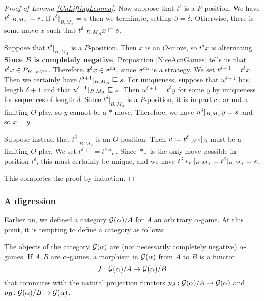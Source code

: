 \documentclass[11pt]{article} %
\begin{document}
\begin{proof}[Proof of Lemma \ref{CnLiftingLemma}]
  Now suppose that $t^\delta$ is a $P$-position.  We have $t^\delta\vert_{B,M_A}\sqsubseteq s$.  If $t^\delta\vert_{B,M_A}=s$ then we terminate, setting $\beta=\delta$.  Otherwise, there is some move $x$ such that $t^\delta\vert_{B,M_A}x\sqsubseteq s$.  

  Suppose that $t^\delta\vert_{B,M_A}$ is a $P$-position.  Then $x$ is an $O$-move, so $t^\delta x$ is alternating.  \textbf{Since $B$ is completely negative}, Proposition \ref{NiceAcnGames} tells us that $t^\delta x\in P_{B\multimap A^{\operatorname{cn}}}$.  Therefore, $t^\delta x\in\sigma^{\operatorname{cn}}$, since $\sigma^{\operatorname{cn}}$ is a strategy.  We set $t^{\delta+1}=t^\delta x$.  Then we certainly have $t^{\delta+1}\vert_{B,M_A}\sqsubseteq s$.  For uniqueness, suppose that $u^{\delta+1}$ has length $\delta+1$ and that $u^{\delta+1}\vert_{B,M_A}\sqsubseteq s$.  Then $u^{\delta+1}=t^\delta y$ for some $y$ by uniqueness for sequences of length $\delta$.  Since $t^\delta\vert_{B,M_A}$ is a $P$-position, it is in particular not a limiting $O$-play, so $y$ cannot be a $*$-move.  Therefore, we have $u^{\delta}\vert_{B,M_A}y\sqsubseteq s$ and so $x=y$.  

  Suppose instead that $t^\delta\vert_{B,M_A}$ is an $O$-position.  Then $v\coloneqq t^\delta\vert_{A^{\operatorname{cn}}}\vert_A$ must be a limiting $O$-play.  We set $t^{\delta+1}=t^\delta *_v$.  Since $*_v$ is the only move possible in position $t^\delta$, this must certainly be unique, and we have $t^\delta *_v\vert_{B,M_A}=t^\delta\vert_{B,M_A}\sqsubseteq s$.  

  This completes the proof by induction.
\end{proof}

\subsubsection{A digression}
\label{DigressionSex}

Earlier on, we defined a category $\mathcal G(\alpha)/A$ for $A$ an arbitrary $\alpha$-game.  At this point, it is tempting to define a category as follows:

\begin{definition}
  The objects of the category $\tilde{\mathcal G}(\alpha)$ are (not necessarily completely negative) $\alpha$-games.  If $A,B$ are $\alpha$-games, a morphism in $\tilde{\mathcal G}(\alpha)$ from $A$ to $B$ is a functor
  \[
    \mathcal F\colon\mathcal G(\alpha)/A\to\mathcal G(\alpha)/B
    \]
  that commutes with the natural projection functors $p_A\colon\mathcal G(\alpha)/A\to\mathcal G(\alpha)$ and $p_B\colon\mathcal G(\alpha)/B\to\mathcal G(\alpha)$.  
\end{definition}
\end{document}
